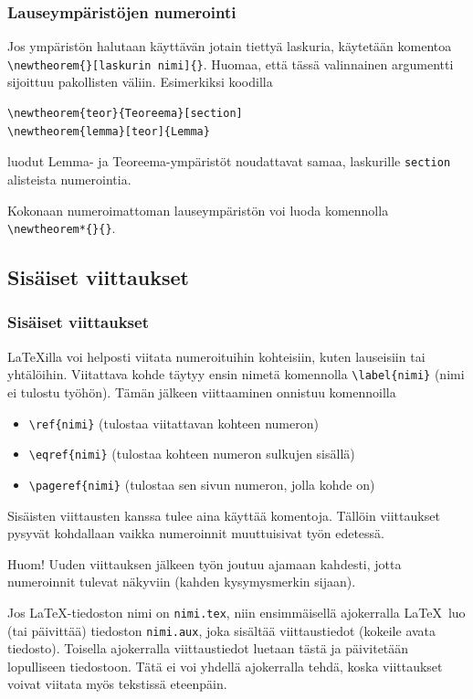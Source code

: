 \begin{frame}[fragile]
    \frametitle{Lauseympäristöjen numerointi}
    Jos ympäristön halutaan käyttävän jotain tiettyä laskuria, käytetään komentoa \verb-\newtheorem{}[laskurin nimi]{}-. Huomaa, että tässä valinnainen argumentti sijoittuu pakollisten väliin. 
    \vaihto
    Esimerkiksi koodilla
    \begin{Verbatim}[frame=single]
\newtheorem{teor}{Teoreema}[section]
\newtheorem{lemma}[teor]{Lemma}
    \end{Verbatim}
    luodut Lemma- ja Teoreema-ympäristöt noudattavat samaa, laskurille \verb-section- alisteista numerointia.
\end{frame}
\begin{frame}[fragile]
    Kokonaan numeroimattoman lauseympäristön voi luoda komennolla \verb-\newtheorem*{}{}-.
    
    
\end{frame}
\subsection{Sisäiset viittaukset}
\begin{frame}[fragile]
    \frametitle{Sisäiset viittaukset}
    \LaTeX illa voi helposti viitata numeroituihin kohteisiin, kuten lauseisiin tai yhtälöihin. Viitattava kohde täytyy ensin nimetä komennolla \verb-\label{nimi}- (nimi ei tulostu työhön). Tämän jälkeen viittaaminen onnistuu komennoilla 
    \begin{itemize}
        \item \verb-\ref{nimi}- (tulostaa viitattavan kohteen numeron)
        \item \verb-\eqref{nimi}- (tulostaa kohteen numeron sulkujen sisällä)
        \item \verb-\pageref{nimi}- (tulostaa sen sivun numeron, jolla kohde on)  
    \end{itemize}
    Sisäisten viittausten kanssa tulee aina käyttää komentoja. Tällöin viittaukset pysyvät kohdallaan vaikka numeroinnit muuttuisivat työn edetessä.
\end{frame}
\begin{frame}[fragile]
    Huom! Uuden viittauksen jälkeen työn joutuu ajamaan kahdesti, jotta numeroinnit tulevat näkyviin (kahden kysymysmerkin sijaan).
    \begin{extra}
        Jos \LaTeX-tiedoston nimi on \verb-nimi.tex-, niin ensimmäisellä ajokerralla \LaTeX\ luo (tai päivittää) tiedoston \verb-nimi.aux-, joka sisältää viittaustiedot (kokeile avata tiedosto). Toisella ajokerralla viittaustiedot luetaan tästä ja päivitetään lopulliseen tiedostoon. Tätä ei voi yhdellä ajokerralla tehdä, koska viittaukset voivat viitata myös tekstissä eteenpäin.
    \end{extra}
    
\end{frame}
